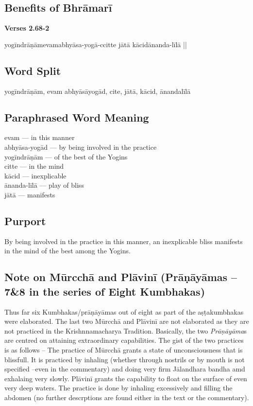 \subsection*{Benefits of Bhrāmarī}


\noindent \textbf{Verses 2.68-2}

\begin{center}
yogīndrāṇāmevamabhyāsa-yogā-ccitte jātā kācidānanda-līlā ||
\end{center}

\subsection*{Word Split}


yogīndrāṇām, evam abhyāsāyogād, cite, jātā, kācid, ānandalīlā

\subsection*{Paraphrased Word Meaning}


\begin{multicols}{2}
evam --- in this manner \\
abhyāsa-yogād ---  by being involved in the practice \\
yogīndrāṇām --- of the best of the Yogins \\
citte  --- in the mind \\
kācid --- inexplicable \\
ānanda-līlā --- play of bliss \\
jātā ---  manifests
\end{multicols}

\subsection*{Purport}


By being involved in the practice in this manner, an inexplicable bliss manifests in the mind of the best among the Yogins.

\subsection*{Note on Mūrcchā and Plāvinī   (Prāṇāyāmas – 7\&8 in the series of Eight Kumbhakas)}


Thus far six Kumbhakas/prāṇāyāmas out of eight as part of the aṣṭakumbhakas were elaborated. The last two Mūrcchā  and Plāvinī are not elaborated as they are not practiced in the Krishnnamacharya Tradition. Basically, the two \textit{Prāṇāyāma}s are centred on attaining extraordinary capabilities.  The gist of the two practices is as follows – The practice of Mūrcchā  grants a state of unconsciousness that is blissfull. It is practiced by inhaling (whether through nostrils or by mouth is not specified –even in the commentary) and doing very firm Jālandhara bandha amd exhalaing very slowly.  Plāvinī grants the capability to float on the surface of even very deep waters. The practice is done by inhaling excessively and filling  the abdomen (no further descrptions are found either in the text or the commentary). 
\newpage

